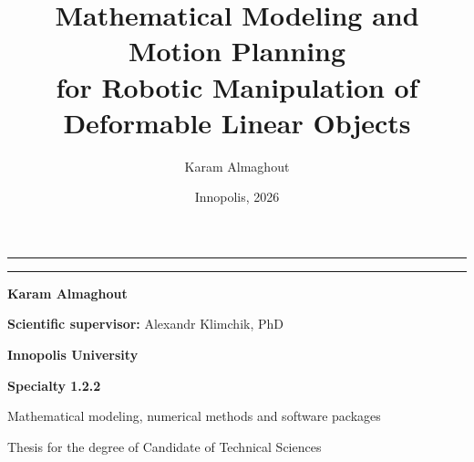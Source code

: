 \documentclass[aspectratio=169,10pt]{beamer}
\title[Mathematical modeling and motion planning]{%
  Mathematical Modeling and Motion Planning\\
  for Robotic Manipulation of Deformable Linear Objects}
\author[Karam Almaghout]{Karam Almaghout}
\institute{Innopolis University}
\date{Innopolis, 2026}
\begin{document}
\begin{frame}[plain]
  \centering
  \vspace*{0.52cm}
  {\color{IUBlue}\rule{\textwidth}{1.0pt}}\par
  \vspace{0.45cm}
  {\color{Ink}\inserttitle\par}
  \vspace{0.25cm}
  {\color{IUBlue}\rule{0.28\textwidth}{2.2pt}}\par

  \vspace{0.58cm}
  {\large\bfseries Karam Almaghout\par}

  \vspace{0.24cm}
  {\small\textbf{Scientific supervisor:} Alexandr Klimchik, PhD\par}
  \vspace{0.24cm}
  {\small\textbf{Innopolis University}\par}

  \vspace{0.24cm}
  {\footnotesize\textbf{Specialty 1.2.2}\par}
  {\footnotesize Mathematical modeling, numerical methods and software packages\par}

  \vfill
  {\small\color{MidGray}Thesis for the degree of Candidate of Technical Sciences\par}
\end{frame}
\end{document}
